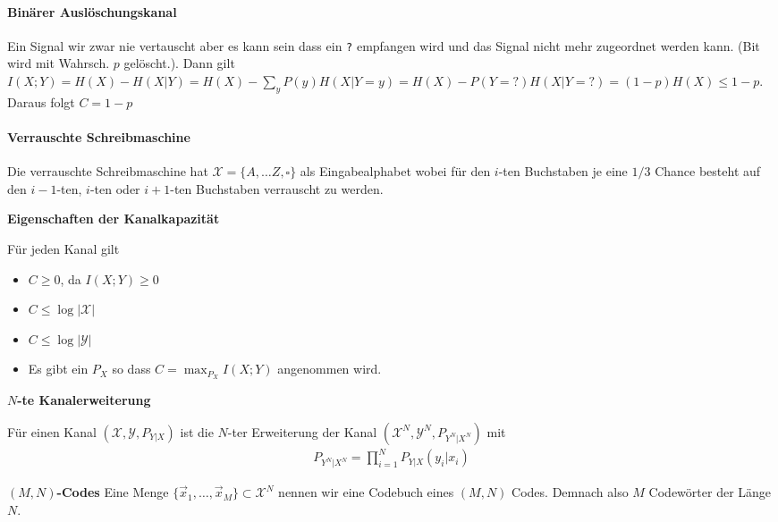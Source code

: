 \documentclass[25pt]{sciposter}
\newenvironment{defn}[1]{\begin{mdframed}[backgroundcolor=blue!10,innertopmargin=15pt, nobreak=true,innerbottommargin=15pt]
		\textbf{#1 }
	}
	{ 
	\end{mdframed}
}
\newenvironment{thm}[1]{\begin{mdframed}[nobreak=true,backgroundcolor=Emerald!10,innertopmargin=15pt, innerbottommargin=15pt]
		\textbf{#1 }
	}
	{ 
	\end{mdframed}
}
\newcommand{\TODO}[1]{\todo[inline]{\Large TODO:  #1}}
\begin{document}
\begin{multicols}{3}
\paragraph{Binärer Auslöschungskanal}
Ein Signal wir zwar nie vertauscht aber es kann sein dass ein \texttt{?} empfangen wird und das Signal nicht mehr zugeordnet werden kann. (Bit wird mit Wahrsch. $p$ gelöscht.). Dann gilt $I(X;Y) = H(X) - H(X|Y) = H(X) - \sum_{y} P(y) H(X|Y=y) = H(X) - P(Y=?)H(X|Y=?) = (1-p)H(X) \leq 1-p$. Daraus folgt $C = 1-p$

\paragraph{Verrauschte Schreibmaschine}
Die verrauschte Schreibmaschine hat $\mathcal{X} = \{A,\ldots Z,\square\}$ als Eingabealphabet wobei für den $i$-ten Buchstaben je eine $1/3$ Chance besteht auf den $i-1$-ten, $i$-ten oder $i+1$-ten Buchstaben verrauscht zu werden.
\TODO{es gilt C = $\log(9)$}






\begin{thm}{Eigenschaften der Kanalkapazität}
	Für jeden Kanal gilt
	\begin{itemize}
		\item $C \geq 0$, da $I(X;Y)\geq 0$
		\item $C \leq \log |\mathcal{X}|$
		\item $C \leq \log |\mathcal{Y}|$
		\item Es gibt ein $P_X$ so dass $C = \max_{P_X} I(X;Y)$ angenommen wird.
	\end{itemize}
\end{thm}



\begin{defn}{$N$-te Kanalerweiterung}
Für einen Kanal $(\mathcal{X},\mathcal{Y}, P_{Y|X})$ ist die $N$-ter Erweiterung der Kanal $(\mathcal{X}^N, \mathcal{Y}^N, P_{Y^N|X^N})$ mit\begin{align*}
	P_{Y^N | X^N} = \prod_{i=1}^{N} P_{Y|X}(y_i|x_i)
\end{align*}
\end{defn}



\begin{defn}{$(M,N)$-Codes} Eine Menge $\{\vec{x}_1,\ldots, \vec{x}_M\} \subset \mathcal{X}^N$ nennen wir eine Codebuch eines $(M,N)$ Codes. Demnach also $M$ Codewörter der Länge $N$.
	

\end{defn}
\end{multicols}
\end{document}
